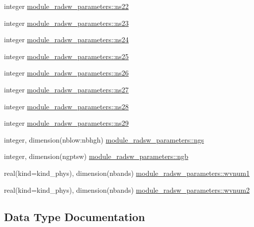 \begin{DoxyCompactItemize}
\item 
integer \hyperlink{namespacemodule__radsw__parameters_a194fffaa7b04c97d8133a9e5686e94d5}{module\+\_\+radsw\+\_\+parameters\+::ns22}
\item 
integer \hyperlink{namespacemodule__radsw__parameters_a547ab92fedb3e35198b384f0337a752c}{module\+\_\+radsw\+\_\+parameters\+::ns23}
\item 
integer \hyperlink{namespacemodule__radsw__parameters_a3cdaa790f548b6407ba586a824c5edc6}{module\+\_\+radsw\+\_\+parameters\+::ns24}
\item 
integer \hyperlink{namespacemodule__radsw__parameters_abaf12fd8281745e299a942530cef1a97}{module\+\_\+radsw\+\_\+parameters\+::ns25}
\item 
integer \hyperlink{namespacemodule__radsw__parameters_a3cf6dd031ffa5545db46bb1b54fe42b6}{module\+\_\+radsw\+\_\+parameters\+::ns26}
\item 
integer \hyperlink{namespacemodule__radsw__parameters_a801c6d2223877ddf3f633dc7ffcd528b}{module\+\_\+radsw\+\_\+parameters\+::ns27}
\item 
integer \hyperlink{namespacemodule__radsw__parameters_ac2b720c6b0ab80759cfe83aa53fb4540}{module\+\_\+radsw\+\_\+parameters\+::ns28}
\item 
integer \hyperlink{namespacemodule__radsw__parameters_ae966fc99ad683e9e0ee30f792db413fc}{module\+\_\+radsw\+\_\+parameters\+::ns29}
\item 
integer, dimension(nblow\+:nbhgh) \hyperlink{namespacemodule__radsw__parameters_a715ab3195493dff0639da443c21e4fb5}{module\+\_\+radsw\+\_\+parameters\+::ngs}
\item 
integer, dimension(ngptsw) \hyperlink{namespacemodule__radsw__parameters_afdd8496d7eaa017f7f1e08e998945c1e}{module\+\_\+radsw\+\_\+parameters\+::ngb}
\item 
real(kind=kind\+\_\+phys), dimension(nbands) \hyperlink{namespacemodule__radsw__parameters_adc7827bd2bed6502a0a60b40b8f1deeb}{module\+\_\+radsw\+\_\+parameters\+::wvnum1}
\item 
real(kind=kind\+\_\+phys), dimension(nbands) \hyperlink{namespacemodule__radsw__parameters_a88594ac7d3fbf13f2fdbac4b3b844d88}{module\+\_\+radsw\+\_\+parameters\+::wvnum2}
\end{DoxyCompactItemize}


\subsection{Data Type Documentation}
\label{structmodule__radsw__parameters_1_1topfsw__type}
\hypertarget{namespacemodule__radsw__parameters_structmodule__radsw__parameters_1_1topfsw__type}{}
